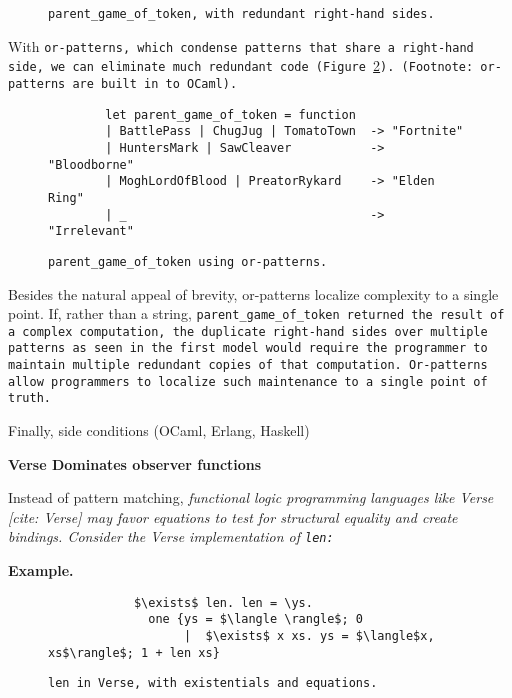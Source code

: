 \documentclass[manuscript,screen,review, 12pt]{acmart}
\begin{document}
\begin{outline}[enumerate]
\begin{figure}
        \caption{\tt{parent\_game\_of\_token}, with redundant right-hand sides.} 
        \label{fig:barepgot}
        \end{figure}

With \tt{or-patterns}, which condense patterns that share a right-hand side, we
can eliminate much redundant code (Figure~\ref{fig:orpgot}). (Footnote:
or-patterns are built in to OCaml). 

    \begin{figure}
    \begin{center}
    \begin{verbatim}
        let parent_game_of_token = function 
        | BattlePass | ChugJug | TomatoTown  -> "Fortnite"
        | HuntersMark | SawCleaver           -> "Bloodborne"
        | MoghLordOfBlood | PreatorRykard    -> "Elden Ring"
        | _                                  -> "Irrelevant"
    \end{verbatim}
    \end{center}    
    \caption{\tt{parent\_game\_of\_token} using or-patterns.} 
    \label{fig:orpgot}
    \end{figure}

    Besides the natural appeal of brevity, or-patterns localize complexity to a
    single point. If, rather than a string, \tt{parent\_game\_of\_token}
    returned the result of a complex computation, the duplicate right-hand sides
    over multiple patterns as seen in the first model would require the
    programmer to maintain multiple redundant copies of that computation.
     Or-patterns allow programmers to
    localize such maintenance to a single point of truth. 

    Finally, side conditions (OCaml, Erlang, Haskell)

     \bf{Verse Dominates observer functions }

    Instead of pattern matching, \it{functional logic programming} languages
    like Verse [cite: Verse] may favor equations to test for structural
    equality and create bindings. Consider the Verse implementation of \tt{len}:

     \bf{Example.}

    \begin{figure}
        \verselst
        \begin{lstlisting}
            $\exists$ len. len = \ys. 
              one {ys = $\langle \rangle$; 0
                   |  $\exists$ x xs. ys = $\langle$x, xs$\rangle$; 1 + len xs}
        \end{lstlisting}
    \caption{\tt{len} in Verse, with existentials and equations.} 
    \label{fig:verselen}
    \end{figure}
    

\end{outline}
\end{document}
